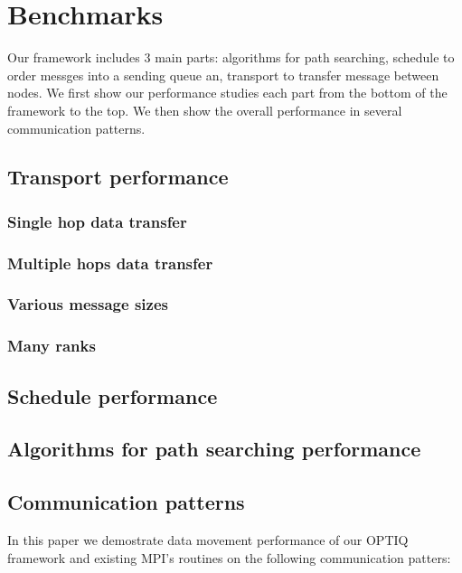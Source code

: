\section{Benchmarks}
\label{sec:benchmark}

Our framework includes 3 main parts: algorithms for path searching, schedule to order messges into a sending queue an, transport to transfer message between nodes. We first show our performance studies each part from the bottom of the framework to the top. We then show the overall performance in several communication patterns.

\subsection{Transport performance}

\subsubsection{Single hop data transfer}

\subsubsection{Multiple hops data transfer}

\subsubsection{Various message sizes}

\subsubsection{Many ranks}

\subsection{Schedule performance}

\subsection{Algorithms for path searching performance }

\subsection{Communication patterns}
In this paper we demostrate data movement performance of our OPTIQ framework and existing MPI's routines on the following communication patters:

